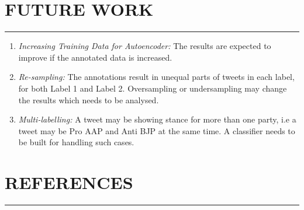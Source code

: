 \documentclass[a4paper,11pt]{article}
\begin{document}
\section{FUTURE WORK}
\hrule
\vspace*{5mm}
\begin{enumerate}
    \item \textit{Increasing Training Data for Autoencoder: } The results are expected to improve if the annotated data is increased.
    \item \textit{Re-sampling: } The annotations result in unequal parts of tweets in each label, for both Label 1 and Label 2. Oversampling or undersampling may change the results which needs to be analysed.
    \item \textit{Multi-labelling: }A tweet may be showing stance for more than one party, i.e a tweet may be Pro AAP and Anti BJP at the same time. A classifier needs to be built for handling such cases.
\end{enumerate}


\newpage
\section{REFERENCES}
\hrule
\vspace*{5mm}


 

\end{document}
